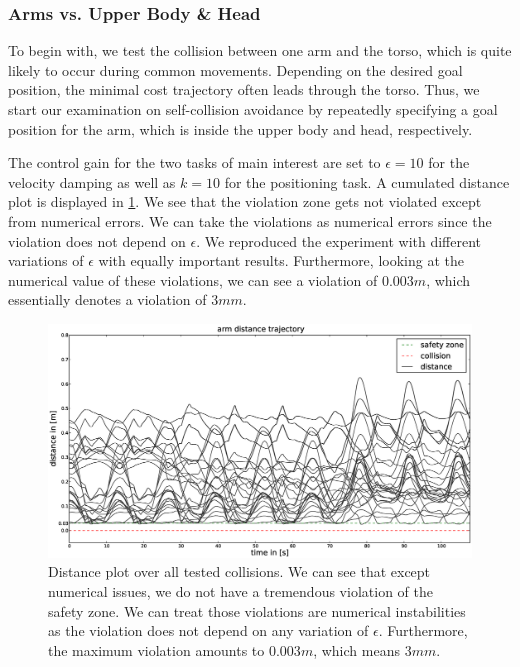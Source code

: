 \clearpage
\subsubsection*{Arms vs. Upper Body \& Head}
To begin with, we test the collision between one arm and the torso, which is quite likely to occur during common movements. Depending on the desired goal position, the minimal cost trajectory often leads through the torso. Thus, we start our examination on self-collision avoidance by repeatedly specifying a goal position for the arm, which is inside the upper body and head, respectively. 

The control gain for the two tasks of main interest are set to $\epsilon=10$ for the velocity damping as well as $k=10$ for the positioning task.   
A cumulated distance plot is displayed in \ref{fig:selfcollisiondistance}. We see that the violation zone gets not violated except from numerical errors. We can take the violations as numerical errors since the violation does not depend on $\epsilon$. We reproduced the experiment with different variations of $\epsilon$ with equally important results. Furthermore, looking at the numerical value of these violations, we can see a violation of $0.003m$, which essentially denotes a violation of $3mm$.  
\begin{figure}[h!]
  \centering
    \includegraphics[width=\textwidth]{../figures/arm_body/distance.eps}
    \caption{Distance plot over all tested collisions. We can see that except numerical issues, we do not have a tremendous violation of the safety zone. We can treat those violations are numerical instabilities as the violation does not depend on any variation of $\epsilon$. Furthermore, the maximum violation amounts to $0.003m$, which means $3mm$.}
    \label{fig:selfcollisiondistance}
\end{figure}


